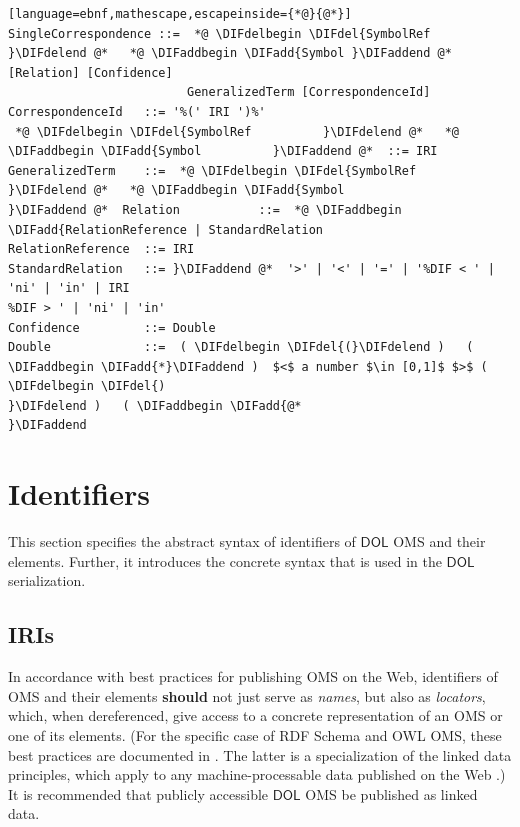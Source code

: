 \documentclass[10pt,fleqn,final]{scrreprt}
\makeatletter
\newcommand*\CommentAuthor{}
\renewcommand*\CommentAuthor{#1}}
\newcommand*\CommentDate{}
\renewcommand*\CommentDate{#1}}
\newcommand*\CommentId{}
\renewcommand*\CommentId{#1}}
\newcommand*\CommentType{}
\renewcommand*\CommentType{#1}}
\newcommand*{\SetCommentColorByType}[1]{%
\edef\localType{{#1}}%
\expandafter\ifstrequal\localType{q-aut}{\colorlet{CommentColor}{red}}{%
\expandafter\ifstrequal\localType{q-all}{\colorlet{CommentColor}{orange}}{%
\expandafter\ifstrequal\localType{todo}{\colorlet{CommentColor}{orange}}{%
\expandafter\ifstrequal\localType{fyi}{\colorlet{CommentColor}{lightgray}}{%
\colorlet{CommentColor}{yellow}}}}}}
\newcommand*{\SetCommentPrefixByType}[1]{%
\edef\localType{{#1}}%
\expandafter\@ifmtarg\localType{%
\edef\CommentPrefix{}%
}{%
\caseupper[q]{#1}%
\edef\CommentPrefix{\thestring: }%
}}
\newcommand*{\initComment}[1]{%
\setkeys{Comment}{#1}%
\SetCommentColorByType{\CommentType}%
\relax%
\SetCommentPrefixByType{\CommentType}%
\relax%
}
\newcommand*{\todonote}[2][]{%
\initComment{#1}%
\pdfcomment[author=\CommentAuthor,color=CommentColor,date=\CommentDate,id=\CommentId]{%
\CommentPrefix
#2}}
\renewcommand*{\todonote}[2][]{%
\initComment{#1}%
\ednote{\CommentPrefix #2}}
\newcommand*{\CLnote}[2][author=Christoph Lange]{%
\todonote[author=Christoph Lange,#1]{#2} 
}
\newcommand*{\should}{\textbf{should}\xspace}
\newcommand*{\DOL}{\ensuremath{\mathsf{DOL}}\xspace}
\newcommand{\sclause}[1]{\section{#1}}
\newcommand{\ssclause}[1]{\subsection{#1}}
\newenvironment{definitions}[0]{\medskip }{}
\providecommand{\DIFadd}[1]{{\protect\color{blue}\uwave{#1}}} %
\providecommand{\DIFdel}[1]{{\protect\color{red}\sout{#1}}}                      %
\providecommand{\DIFaddbegin}{} %
\providecommand{\DIFaddend}{} %
\providecommand{\DIFdelbegin}{} %
\providecommand{\DIFdelend}{} %
\makeatother
\begin{document}
\begin{definitions}
\begin{lstlisting}[language=ebnf,mathescape,escapeinside={*@}{@*}]
SingleCorrespondence ::=  *@ \DIFdelbegin \DIFdel{SymbolRef }\DIFdelend @*   *@ \DIFaddbegin \DIFadd{Symbol }\DIFaddend @*  [Relation] [Confidence]
                         GeneralizedTerm [CorrespondenceId]
CorrespondenceId   ::= '%(' IRI ')%'
 *@ \DIFdelbegin \DIFdel{SymbolRef          }\DIFdelend @*   *@ \DIFaddbegin \DIFadd{Symbol          }\DIFaddend @*  ::= IRI
GeneralizedTerm    ::=  *@ \DIFdelbegin \DIFdel{SymbolRef
}\DIFdelend @*   *@ \DIFaddbegin \DIFadd{Symbol
}\DIFaddend @*  Relation           ::=  *@ \DIFaddbegin \DIFadd{RelationReference | StandardRelation
RelationReference  ::= IRI
StandardRelation   ::= }\DIFaddend @*  '>' | '<' | '=' | '%DIF < ' | 'ni' | 'in' | IRI
%DIF > ' | 'ni' | 'in'
Confidence         ::= Double
Double             ::=  ( \DIFdelbegin \DIFdel{(}\DIFdelend )   ( \DIFaddbegin \DIFadd{*}\DIFaddend )  $<$ a number $\in [0,1]$ $>$ ( \DIFdelbegin \DIFdel{) 
}\DIFdelend )   ( \DIFaddbegin \DIFadd{@*
}\DIFaddend \end{lstlisting}






\sclause{Identifiers}\label{c:identifiers}
This section specifies the abstract syntax of identifiers of \DOL OMS and their elements. Further, 
it introduces the concrete syntax that is used in the \DOL serialization. 
\DIFdelbegin %

\DIFdelend \ssclause{IRIs}\label{c:iris}


In accordance with best practices for publishing OMS on the Web, identifiers of OMS and their 
elements \should not just serve as \emph{names}, but also as \emph{locators}, which, when 
dereferenced, give access to a concrete representation of an OMS or one of its elements.  (For the 
specific case of RDF Schema and OWL OMS, these best practices are documented in 
\cite{W3C:NOTE-swbp-vocab-pub-20080828}.  The latter is a specialization of the linked data 
principles, which apply to any machine-processable data published on the Web 
\cite{BernersLee:LinkedData2006}.)  It is recommended that publicly accessible \DOL OMS be published 
as linked data.


\end{definitions}
\end{document}
